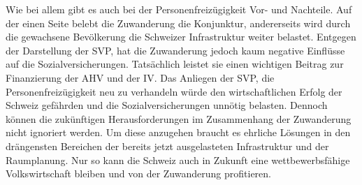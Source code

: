 Wie bei allem gibt es auch bei der Personenfreizügigkeit Vor- und Nachteile.
Auf der einen Seite belebt die Zuwanderung die Konjunktur, andererseits 
wird durch die gewachsene Bevölkerung die Schweizer Infrastruktur weiter belastet. Entgegen der Darstellung der SVP,
hat die Zuwanderung jedoch kaum negative Einflüsse auf die Sozialversicherungen. Tatsächlich leistet sie einen wichtigen Beitrag
zur Finanzierung der AHV und der IV. Das Anliegen der SVP, die Personenfreizügigkeit neu zu verhandeln würde den wirtschaftlichen 
Erfolg der Schweiz gefährden und die Sozialversicherungen unnötig belasten. Dennoch können die zukünftigen Herausforderungen
im Zusammenhang der Zuwanderung nicht ignoriert werden. Um diese anzugehen braucht es ehrliche Lösungen in den drängensten 
Bereichen der bereits jetzt ausgelasteten Infrastruktur und der Raumplanung. Nur so kann die Schweiz auch in Zukunft 
eine wettbewerbsfähige Volkswirtschaft bleiben und von der Zuwanderung profitieren.
